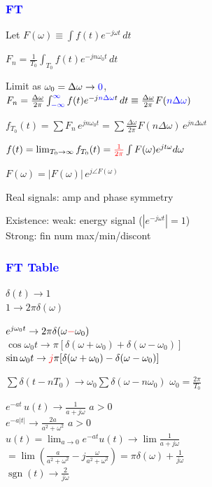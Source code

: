 \documentclass[4pt]{article}
\theoremstyle{definition}
\theoremstyle{definition}
\renewcommand{\o}{\omega}
\newcommand{\ra}{\rightarrow}
\DeclareMathOperator{\sgn}{sgn}
\newcommand{\red}[1]{\textcolor{red}{#1}}
\newcommand{\blue}[1]{\textcolor{blue}{#1}}
\begin{document}
\begin{landscape}
\begin{multicols}{3}
\subsubsection*{\blue{FT}}
    Let \(F(\omega) \equiv \int f(t) e^{-j\omega t} \, dt\)

    \(F_n = \frac 1 {T_0} \int_{T_0} f(t) e^{-jn\omega_0 t} \, dt\)

    Limit as $\omega_0 =\Delta\omega \ra \blue 0$,\\
    \(F_n = \frac {\Delta\omega}{2\pi} \int_{\blue{-\infty}}^{\blue{\infty}} f(t) e^{-j \blue{n\Delta\omega} t} \, dt
    \equiv \frac{\Delta\omega}{2\pi} F(\blue{n\Delta\omega})\) %

    \(f_{T_0}(t) = \sum F_n\, e^{jn\omega_0 t} = \sum \frac {\Delta\omega} {2\pi} F(n\Delta\omega)\,  e^{jn\Delta\omega t}\)

    \(f(t) = \lim_{T_0\ra \infty} f_{T_0} (t) = \red{\frac{1}{2\pi}}\int F(\omega) e^{jt\omega} d\omega\)

    \(F(\omega) = |F(\omega)| \, e^{j\angle F(\omega)}\)

    Real signals: amp and phase symmetry

    Existence: weak: energy signal ($|e^{-j\o t}| = 1$)\\
    Strong: fin num max/min/discont

\subsubsection*{\blue{FT Table}}

    \(\delta(t) \ra 1\)\\
    $1 \ra 2\pi\delta(\omega)$

    \(e^{j\o_0 t}\ra 2\pi\delta(\o \red{-} \o_0)\)\\         %
    \(\cos \o_0 t\ra \pi[\delta(\o+\o_0) + \delta(\o - \o_0)]\)\\
    \(\sin \o_0 t\ra \red{j}\pi[\delta(\o + \o_0) - \delta(\o - \o_0)]\)

    \(\sum \delta(t-nT_0) \ra \o_0\sum \delta(\o - n\o_0)\)             \hfill  $\o_0 = \frac{2\pi}{T_0}$

    $e^{-at} \, u(t) \ra \frac{1}{a+j\omega}$                           \hfill  $a > 0$\\
    $e^{-a|t|} \ra \frac{2a}{a^2+\omega^2}$                             \hfill $a > 0$\\
    \(u(t) = \lim_{a\ra 0} e^{-at} u(t)\ra \lim \frac{1}{a+j\o}\)\\
        \hspace{1em} \( = \lim(\frac{a}{a^2+\o^2} - j\frac{\o}{a^2+\o^2 }) = \pi\delta(\o) + \frac{1}{j\o}\) \\      %
    \(\sgn(t)\ra \frac{2}{j\o}\)


\end{multicols}
\end{landscape}
\end{document}
